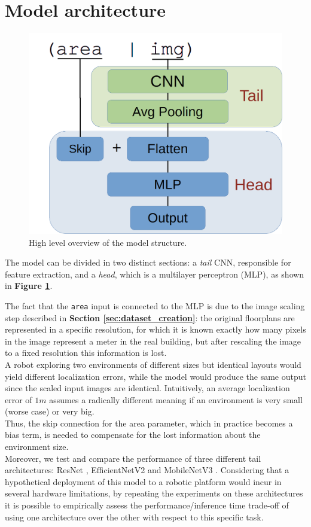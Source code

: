 \section{Model architecture} %
\begin{figure}[htb!]
    \centering
    \includegraphics[width=0.48\linewidth]{images/cnnStruct.png}
    \caption{High level overview of the model structure.}
    \label{fig:cnn_arch}
\end{figure}

\noindent
The model can be divided in two distinct sections: a \textit{tail} CNN, responsible for feature extraction, and a \textit{head}, which is a multilayer perceptron (MLP), as shown in \textbf{Figure \ref{fig:cnn_arch}}. 

\noindent
The fact that the \texttt{area} input is connected to the MLP is due to the image scaling step described in \textbf{Section \ref{sec:dataset_creation}}: the original floorplans are represented in a specific resolution, for which it is known exactly how many pixels in the image represent a meter in the real building, but after rescaling the image to a fixed resolution this information is lost. \\
A robot exploring two environments of different sizes but identical layouts would yield different localization errors, while the model would produce the same output since the scaled input images are identical. Intuitively, an average localization error of $1m$ assumes a radically different meaning if an environment is very small (worse case) or very big. \\
Thus, the skip connection for the area parameter, which in practice becomes a bias term, is needed to compensate for the lost information about the environment size. \\

\noindent
Moreover, we test and compare the performance of three different tail architectures: ResNet \cite{resnet2016}, EfficientNetV2 \cite{efficientnet} and MobileNetV3 \cite{mobileNetV3_2019}. 
Considering that a hypothetical deployment of this model to a robotic platform would incur in several hardware limitations, by repeating the experiments on these architectures it is possible to empirically assess the performance/inference time trade-off of using one architecture over the other with respect to this specific task. 

